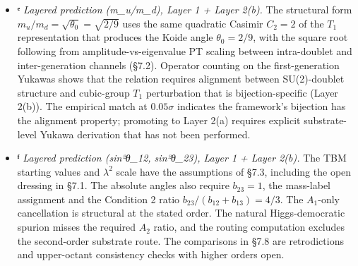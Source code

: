 \documentclass[
]{article}
\begin{document}
\begin{itemize}
  parametrizations; the \(J\) row tests the combination \(A^2\lambda^6\)
  only to the extent the extraction of \(\eta\) is insensitive to that
  mixing.
\item
  \textbf{ᵉ} \emph{Layered prediction (m\_u/m\_d), Layer 1 + Layer
  2(b).} The structural form \(m_u/m_d = \sqrt{\theta_0} = \sqrt{2/9}\)
  uses the same quadratic Casimir \(C_2 = 2\) of the \(T_1\)
  representation that produces the Koide angle \(\theta_0 = 2/9\), with
  the square root following from amplitude-vs-eigenvalue PT scaling
  between intra-doublet and inter-generation channels (§7.2). Operator
  counting on the first-generation Yukawas shows that the relation
  requires alignment between SU(2)-doublet structure and cubic-group
  \(T_1\) perturbation that is bijection-specific (Layer 2(b)). The
  empirical match at \(0.05\sigma\) indicates the framework's bijection
  has the alignment property; promoting to Layer 2(a) requires explicit
  substrate-level Yukawa derivation that has not been performed.
\item
  \textbf{ᶠ} \emph{Layered prediction (sin²θ\_12, sin²θ\_23), Layer 1 +
  Layer 2(b).} The TBM starting values and \(\lambda^2\) scale have the
  assumptions of §7.3, including the open dressing in §7.1. The absolute
  angles also require \(b_{23}=1\), the mass-label assignment and the
  Condition 2 ratio \(b_{23}/(b_{12}+b_{13})=4/3\). The \(A_1\)-only
  cancellation is structural at the stated order. The natural
  Higgs-democratic spurion misses the required \(A_2\) ratio, and the
  routing computation excludes the second-order substrate route. The
  comparisons in §7.8 are retrodictions and upper-octant consistency
  checks with higher orders open.
\end{itemize}
\end{document}
